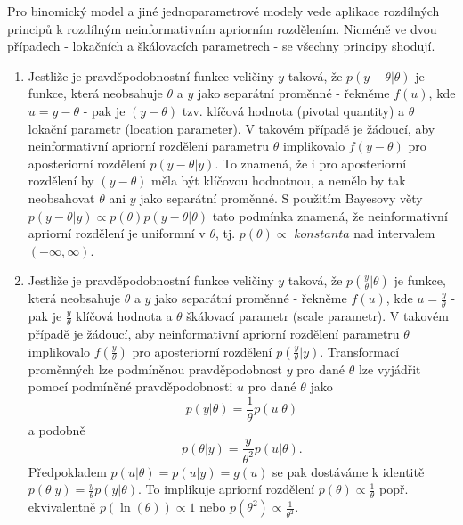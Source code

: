 Pro binomický model a jiné jednoparametrové modely vede aplikace rozdílných principů k rozdílným neinformativním apriorním rozdělením. Nicméně ve dvou případech - lokačních a škálovacích parametrech - se všechny principy shodují.
\begin{enumerate}
\item Jestliže je pravděpodobnostní funkce veličiny $y$ taková, že $p(y - \theta | \theta)$ je funkce, která neobsahuje $\theta$ a $y$ jako separátní proměnné - řekněme $f(u)$, kde $u = y - \theta$ - pak je $(y - \theta)$ tzv. klíčová hodnota (pivotal quantity) a $\theta$ lokační parametr (location parameter). V takovém případě je žádoucí, aby neinformativní apriorní rozdělení parametru $\theta$ implikovalo $f(y - \theta)$ pro aposteriorní rozdělení $p(y - \theta | y)$. To znamená, že i pro aposteriorní rozdělení by $(y - \theta)$ měla být klíčovou hodnotnou, a nemělo by tak neobsahovat $\theta$ ani $y$ jako separátní proměnné. S použitím Bayesovy věty $p(y - \theta | y) \varpropto p(\theta)p(y - \theta | \theta)$ tato podmínka znamená, že neinformativní apriorní rozdělení je uniformní v $\theta$, tj. $p(\theta) \varpropto \textit{ konstanta}$ nad intervalem $(-\infty, \infty)$.
\item Jestliže je pravděpodobnostní funkce veličiny $y$ taková, že $p(\frac{y}{\theta} | \theta)$ je funkce, která neobsahuje $\theta$ a $y$ jako separátní proměnné - řekněme $f(u)$, kde $u = \frac{y}{\theta}$ - pak je $\frac{y}{\theta}$ klíčová hodnota a $\theta$ škálovací parametr (scale parametr). V takovém případě je žádoucí, aby neinformativní apriorní rozdělení parametru $\theta$ implikovalo $f(\frac{y}{\theta})$ pro aposteriorní rozdělení $p(\frac{y}{\theta} | y)$. Transformací proměnných lze podmíněnou pravděpodobnost $y$ pro dané $\theta$ lze vyjádřit pomocí podmíněné pravděpodobnosti $u$ pro dané $\theta$ jako
\begin{equation}
p(y | \theta) = \frac{1}{\theta} p(u | \theta)
\end{equation}
a podobně
\begin{equation}
p(\theta | y) = \frac{y}{\theta^2}p(u | \theta).
\end{equation}
Předpokladem $p(u | \theta) = p(u | y) = g(u)$ se pak dostáváme k identitě $p(\theta | y) = \frac{y}{\theta}p(y | \theta)$. To implikuje apriorní rozdělení $p(\theta) \varpropto \frac{1}{\theta}$ popř. ekvivalentně $p(\ln(\theta)) \varpropto 1$ nebo $p(\theta^2) \varpropto \frac{1}{\theta ^ 2}$.
\end{enumerate}

